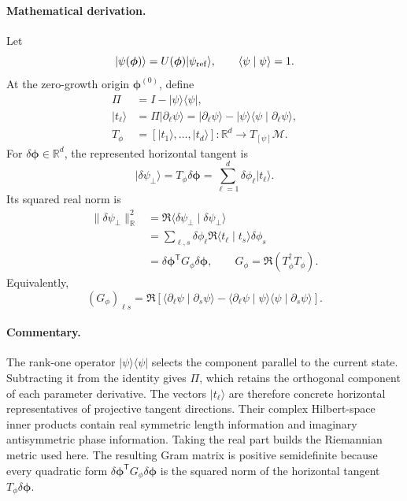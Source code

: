 \documentclass[10pt,twocolumn]{article}
\newcommand{\ket}[1]{\lvert #1\rangle}
\newcommand{\bra}[1]{\langle #1\rvert}
\newcommand{\braket}[2]{\langle #1\mid #2\rangle}
\newcommand{\R}{\mathbb R}
\newcommand{\mathderiv}{\paragraph{Mathematical derivation.}}
\newcommand{\commentaryblock}{\paragraph{Commentary.}}
\begin{document}
\mathderiv Let
\begin{equation}
\ket{\psi(\bm\phi)}=U(\bm\phi)\ket{\psi_{\rm ref}},\qquad
\braket{\psi}{\psi}=1.
\label{eq:normalized-state}
\end{equation}
At the zero-growth origin \(\bm\phi^{(0)}\), define
\begin{align}
\Pi&=I-\ket\psi\bra\psi,\nonumber\\
\ket{t_\ell}&=\Pi\ket{\partial_\ell\psi}
=\ket{\partial_\ell\psi}
-\ket\psi\braket{\psi}{\partial_\ell\psi},\nonumber\\
T_\phi&=[\ket{t_1},\ldots,\ket{t_d}]
:\R^d\longrightarrow T_{[\psi]}\mathcal M.
\label{eq:horizontal-tangents}
\end{align}
For \(\delta\bm\phi\in\R^d\), the represented horizontal tangent is
\begin{equation}
\ket{\delta\psi_\perp}=T_\phi\delta\bm\phi
=\sum_{\ell=1}^{d}\delta\phi_\ell\ket{t_\ell}.
\label{eq:tangent-combination}
\end{equation}
Its squared real norm is
\begin{align}
\|\delta\psi_\perp\|_{\R}^2
&=\Re\braket{\delta\psi_\perp}{\delta\psi_\perp}\nonumber\\
&=\sum_{\ell,s}\delta\phi_\ell
\Re\braket{t_\ell}{t_s}\delta\phi_s\nonumber\\
&=\delta\bm\phi^{\mathsf T}G_\phi\delta\bm\phi,
\qquad
G_\phi=\Re(T_\phi^\dagger T_\phi).
\label{eq:logical-fs-gram}
\end{align}
Equivalently,
\begin{equation}
(G_\phi)_{\ell s}
=\Re\!\left[
\braket{\partial_\ell\psi}{\partial_s\psi}
-\braket{\partial_\ell\psi}{\psi}
 \braket{\psi}{\partial_s\psi}
\right].
\label{eq:fs-components}
\end{equation}

\commentaryblock The rank-one operator \(\ket\psi\bra\psi\) selects the
component parallel to the current state. Subtracting it from the identity gives
\(\Pi\), which retains the orthogonal component of each parameter derivative.
The vectors \(\ket{t_\ell}\) are therefore concrete horizontal
representatives of projective tangent directions. Their complex Hilbert-space
inner products contain real symmetric length information and imaginary
antisymmetric phase information. Taking the real part builds the Riemannian
metric used here. The resulting Gram matrix is positive semidefinite because
every quadratic form
\(\delta\bm\phi^{\mathsf T}G_\phi\delta\bm\phi\) is the squared norm of the
horizontal tangent \(T_\phi\delta\bm\phi\).
\end{document}
